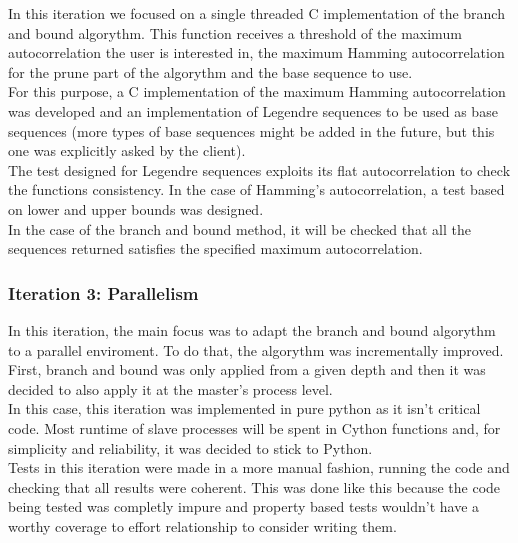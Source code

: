       In this iteration we focused on a single threaded C implementation of the
      branch and bound algorythm. This function receives a threshold of the
      maximum autocorrelation the user is interested in, the maximum Hamming
      autocorrelation for the prune part of the algorythm and the base sequence
      to use.\\

      For this purpose, a C implementation of the maximum Hamming
      autocorrelation was developed and an implementation of Legendre sequences
      to be used as base sequences (more types of base sequences might be added
      in the future, but this one was explicitly asked by the client).\\

      The test designed for Legendre sequences exploits its flat
      autocorrelation to check the functions consistency. In the case of
      Hamming's autocorrelation, a test based on lower and upper
      bounds was designed.\\

      In the case of the branch and bound method, it will be checked that all the
      sequences returned satisfies the specified maximum autocorrelation.\\

      \subsubsection{Iteration 3: Parallelism}

      In this iteration, the main focus was to adapt the branch and bound algorythm
      to a parallel enviroment. To do that, the algorythm was incrementally
      improved. First, branch and bound was only applied from a given depth and
      then it was decided to also apply it at the master's process level.\\

      In this case, this iteration was implemented in pure python as it isn't
      critical code. Most runtime of slave processes will be spent in Cython
      functions and, for simplicity and reliability, it was decided to stick to
      Python.\\

      Tests in this iteration were made in a more manual fashion, running the
      code and checking that all results were coherent. This was done like
      this because the code being tested was completly impure and property
      based tests wouldn't have a worthy coverage to effort relationship to
      consider writing them.\\

